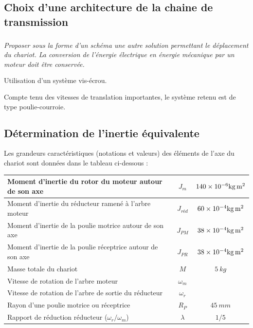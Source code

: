 \documentclass[10pt,fleqn]{article} %
\begin{document}
\begin{multicols}{2}
\fi
\subsection*{Choix d'une architecture de la chaine de transmission}
\subparagraph{}
\textit{Proposer sous la forme d'un schéma une autre solution permettant le déplacement du chariot. La conversion de l'énergie électrique en énergie mécanique par un moteur doit être conservée.}

\ifprof
\begin{corrige}
Utilisation d’un système vis-écrou.
\end{corrige}
\else
\fi

\ifprof
\else
Compte tenu des vitesses de translation importantes, le système retenu est de type poulie-courroie.
\fi

\subsection*{Détermination de l'inertie équivalente} 
\ifprof
\else

Les grandeurs caractéristiques (notations et valeurs) des éléments de l'axe du chariot sont données dans le tableau ci-dessous :
\begin{center}
\begin{tabular}{|p{3cm}|c|c|}
\hline
Moment d'inertie du rotor du moteur autour de son axe&	$J_m$ & $\num{140d-6}\si{kg.m^2}$ \\ \hline
Moment d'inertie du réducteur ramené à l'arbre moteur&	$J_{réd}$ & $\num{60d-4}\si{kg.m^2}$ \\ \hline
Moment d'inertie de la poulie motrice autour de son axe&	$J_{PM}$	&$ \num{38d-4}\si{kg.m^2}$ \\ \hline
Moment d'inertie de la poulie réceptrice autour de son axe&	$J_{PR}$ & $\num{38d-4}\si{kg.m^2}$ \\ \hline
Masse totale du chariot	&$M$ &$\SI{5}{kg}$ \\ \hline
Vitesse de rotation de l'arbre moteur &$\omega_m$ &  \\ \hline
Vitesse de rotation de l'arbre de sortie du réducteur	&$\omega_r$&  \\ \hline
Rayon d'une poulie motrice ou réceptrice	& $R_P$ &$\SI{45}{mm}$ \\ \hline
Rapport de réduction réducteur ($\omega_r/\omega_m$)	& $\lambda$	&$1/5$ \\ \hline
\end{tabular}
\end{center}
\fi


\end{multicols}
\end{document}
